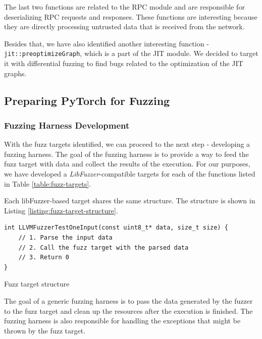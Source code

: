 The last two functions are related to the RPC module and are responsible for deserializing RPC requests and responses. These functions are interesting because they are directly processing untrusted data that is received from the network.

Besides that, we have also identified another interesting function - \\ \texttt{jit::preoptimizeGraph}, which is a part of the JIT module. We decided to target it with differential fuzzing to find bugs related to the optimization of the JIT graphs.

\subsection{Preparing PyTorch for Fuzzing}
\subsubsection{Fuzzing Harness Development}

With the fuzz targets identified, we can proceed to the next step - developing a fuzzing harness. The goal of the fuzzing harness is to provide a way to feed the fuzz target with data and collect the results of the execution. For our purposes, we have developed a \textit{LibFuzzer}-compatible \cite{libfuzzer-secdev-2016} targets for each of the functions listed in Table \ref{table:fuzz-targets}.

Each libFuzzer-based target shares the same structure. The structure is shown in Listing \ref{listing:fuzz-target-structure}.

\begin{listing}[h]
    \centering
    \begin{minipage}{.9\linewidth}
        \begin{verbatim}
int LLVMFuzzerTestOneInput(const uint8_t* data, size_t size) {
    // 1. Parse the input data
    // 2. Call the fuzz target with the parsed data
    // 3. Return 0
}
    \end{verbatim}
    \end{minipage}
    \caption{Fuzz target structure}
    \label{listing:fuzz-target-structure}
\end{listing}

The goal of a generic fuzzing harness is to pass the data generated by the fuzzer to the fuzz target and clean up the resources after the execution is finished. The fuzzing harness is also responsible for handling the exceptions that might be thrown by the fuzz target.

